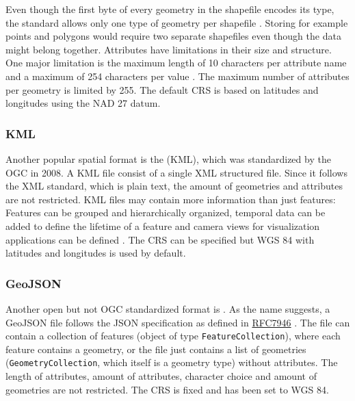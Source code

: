			Even though the first byte of every geometry in the shapefile encodes its type, the standard allows only one type of geometry per shapefile \cite{esri-shapefile-spec}.
			Storing for example points and polygons would require two separate shapefiles even though the data might belong together.
			Attributes have limitations in their size and structure.
			One major limitation is the maximum length of 10 characters per attribute name and a maximum of 254 characters per value \cite{esri-shapefile-limitations}.
			The maximum number of attributes per geometry is limited by 255.
			The default CRS is based on latitudes and longitudes using the NAD 27 datum\cite{esri-shapefile-coordinate-system}.
			
		\subsubsection{KML}
		
			Another popular spatial format is the  (KML), which was standardized by the OGC in 2008\cite{ogc-kml-2.2}.
			A KML file consist of a single XML structured file.
			Since it follows the XML standard, which is plain text, the amount of geometries and attributes are not restricted.
			KML files may contain more information than just features:
			Features can be grouped and hierarchically organized, temporal data can be added to define the lifetime of a feature and camera views for visualization applications can be defined \cite{ogc-kml-2.3}.
			The CRS can be specified but WGS 84 with latitudes and longitudes is used by default.
		
		\subsubsection{GeoJSON}
		\label{subsubsec:geojson}
		
			Another open but not OGC standardized format is .
			As the name suggests, a GeoJSON file follows the JSON specification as defined in \href{https://datatracker.ietf.org/doc/html/rfc7946}{RFC7946} \cite{ietf-geojson}.
			The file can contain a collection of features (object of type \texttt{FeatureCollection}), where each feature contains a geometry, or the file just contains a list of geometries (\texttt{GeometryCollection}, which itself is a geometry type) without attributes.
			The length of attributes, amount of attributes, character choice and amount of geometries are not restricted.
			The CRS is fixed and has been set to WGS 84.
			

